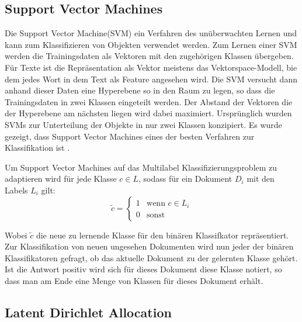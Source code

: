 \subsection{Support Vector Machines}
\label{sub:support_vector_machines}
Die  Support Vector Machine(SVM) ein Verfahren des unüberwachten Lernen und kann zum Klassifizieren von Objekten verwendet werden. Zum Lernen einer SVM werden die Trainingsdaten als Vektoren mit den zugehörigen Klassen übergeben. Für Texte ist die Repräsentation als Vektor meistens das Vektorspace-Modell, bie dem jedes Wort in dem Text als Feature angesehen wird. Die SVM versucht dann anhand dieser Daten eine Hyperebene so in den Raum zu legen, so dass die Trainingsdaten in zwei Klassen eingeteilt werden. Der Abstand der Vektoren die der Hyperebene am nächsten liegen wird dabei maximiert. Ursprünglich wurden SVMs zur Unterteilung der Objekte in nur zwei Klassen konzipiert.
Es wurde gezeigt, dass Support Vector Machines eines der besten Verfahren zur Klassifikation ist \cite{Joachims:1998:TCS:645326.649721}.







Um Support Vector Machines auf das Multilabel Klassifizierungsproblem zu adaptieren wird für jede Klasse $c \in L$, sodass für ein Dokument $D_i$ mit den Labels $L_i$ gilt:
\[
    \tilde c =
    \begin{cases}
        1 &\mbox{wenn } c \in L_i \\
        0 &\mbox{sonst}
    \end{cases}
\]

Wobei $\tilde c$ die neue zu lernende Klasse für den  binären Klassifkator repräsentiert.
Zur Klassifikation von neuen ungesehen Dokumenten wird nun jeder der binären Klassifikatoren gefragt, ob das aktuelle Dokument zu der gelernten Klasse gehört. Ist die Antwort positiv wird sich für dieses Dokument diese Klasse notiert, so dass man am Ende eine Menge von Klassen für dieses Dokument erhält.




\subsection{Latent Dirichlet Allocation}
\label{sub:latent_dirichlet_allocation}
